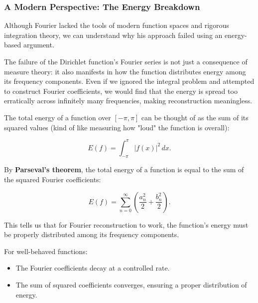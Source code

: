 \documentclass{article}
\begin{document}
\subsubsection{A Modern Perspective: The Energy Breakdown}

Although Fourier lacked the tools of modern function spaces and rigorous integration theory, we can understand why his approach failed using an energy-based argument.

The failure of the Dirichlet function’s Fourier series is not just a consequence of measure theory: it also manifests in how the function distributes energy among its frequency components. Even if we ignored the integral problem and attempted to construct Fourier coefficients, we would find that the energy is spread too erratically across infinitely many frequencies, making reconstruction meaningless.

The total energy of a function over \( [-\pi, \pi] \) can be thought of as the sum of its squared values (kind of like measuring how "loud" the function is overall):

\[
E(f) = \int_{-\pi}^{\pi} |f(x)|^2 \,dx.
\]

By \textbf{Parseval’s theorem}, the total energy of a function is equal to the sum of the squared Fourier coefficients:

\[
E(f) = \sum_{n=0}^{\infty} \left( \frac{a_n^2}{2} + \frac{b_n^2}{2} \right).
\]

This tells us that for Fourier reconstruction to work, the function’s energy must be properly distributed among its frequency components.

For well-behaved functions:
\begin{itemize}
    \item The Fourier coefficients decay at a controlled rate.
    \item The sum of squared coefficients converges, ensuring a proper distribution of energy.
\end{itemize}
\end{document}
